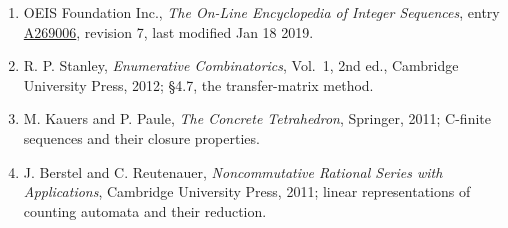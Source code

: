 \documentclass[11pt]{article}
\theoremstyle{definition}
\begin{document}
\begin{enumerate}

\item OEIS Foundation Inc., \emph{The On-Line Encyclopedia of Integer Sequences}, entry \href{https://oeis.org/A269006}{A269006}, revision 7, last modified Jan 18 2019.

\item R. P. Stanley, \emph{Enumerative Combinatorics}, Vol.~1, 2nd ed., Cambridge University Press, 2012; \S4.7, the transfer-matrix method.

\item M. Kauers and P. Paule, \emph{The Concrete Tetrahedron}, Springer, 2011; C-finite sequences and their closure properties.

\item J. Berstel and C. Reutenauer, \emph{Noncommutative Rational Series with Applications}, Cambridge University Press, 2011; linear representations of counting automata and their reduction.

\end{enumerate}
\end{document}
